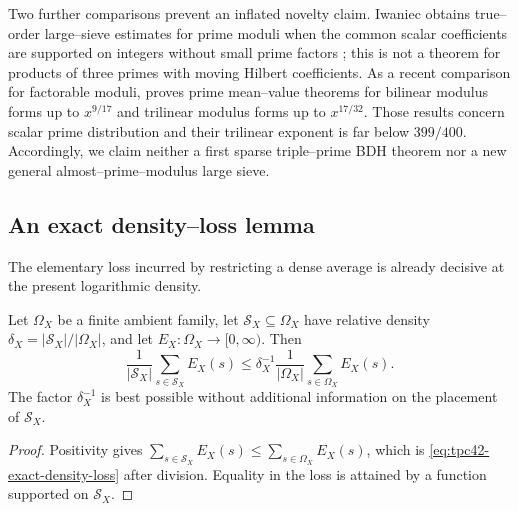 Two further comparisons prevent an inflated novelty claim.  Iwaniec
obtains true--order large--sieve estimates for prime moduli when the
common scalar coefficients are supported on integers without small prime
factors \citep{Iwaniec2022PrimeModuli}; this is not a theorem for products
of three primes with moving Hilbert coefficients.  As a recent comparison
for factorable moduli, \citet{Li2026LargeModuli} proves prime
mean--value theorems for bilinear modulus forms up to \(x^{9/17}\) and
trilinear modulus forms up to \(x^{17/32}\).  Those results concern scalar
prime distribution and their trilinear exponent is far below
\(399/400\).  Accordingly, we claim neither a first sparse
triple--prime BDH theorem nor a new general almost--prime--modulus large
sieve.

\subsection{An exact density--loss lemma}

The elementary loss incurred by restricting a dense average is already
decisive at the present logarithmic density.

\begin{lemma}
\label{lem:tpc42-density-loss}
Let \(\Omega_X\) be a finite ambient family, let
\(\mathcal S_X\subseteq\Omega_X\) have relative density
\(\delta_X=|\mathcal S_X|/|\Omega_X|\), and let
\(E_X:\Omega_X\to[0,\infty)\).  Then
\begin{equation}
 \frac1{|\mathcal S_X|}\sum_{s\in\mathcal S_X}E_X(s)
 \le
 \delta_X^{-1}
 \frac1{|\Omega_X|}\sum_{s\in\Omega_X}E_X(s).
 \label{eq:tpc42-exact-density-loss}
\end{equation}
The factor \(\delta_X^{-1}\) is best possible without additional
information on the placement of \(\mathcal S_X\).
\end{lemma}

\begin{proof}
Positivity gives
\(\sum_{s\in\mathcal S_X}E_X(s)
\le\sum_{s\in\Omega_X}E_X(s)\), which is
\eqref{eq:tpc42-exact-density-loss} after division.  Equality in the loss
is attained by a function supported on \(\mathcal S_X\).
\end{proof}

